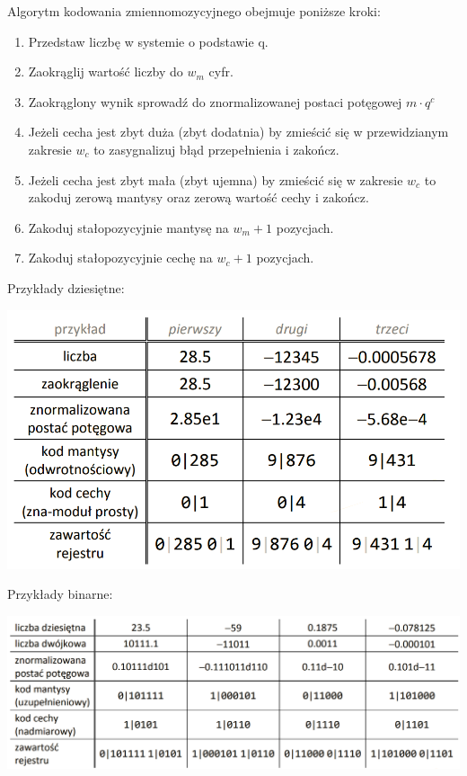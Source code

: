 \documentclass[12pt]{article}
\begin{document}
    Algorytm kodowania zmiennomozycyjnego obejmuje poniższe kroki:
    \begin{enumerate}
        \item Przedstaw liczbę w systemie o podstawie q.
        \item Zaokrąglij wartość liczby do $w_m$ cyfr.
        \item Zaokrąglony wynik sprowadź do znormalizowanej postaci
        potęgowej $m\cdot q^c$
        \item Jeżeli cecha jest zbyt duża (zbyt dodatnia) by zmieścić się
        w przewidzianym zakresie $w_c$ to zasygnalizuj błąd przepełnienia i zakończ.
        \item Jeżeli cecha jest zbyt mała (zbyt ujemna) by zmieścić się
        w zakresie $w_c$ to zakoduj zerową mantysy oraz zerową wartość cechy i zakończ.
        \item Zakoduj stałopozycyjnie mantysę na $w_m + 1$ pozycjach.
        \item Zakoduj stałopozycyjnie cechę na $w_c + 1$ pozycjach.
    \end{enumerate}
    
    Przykłady dziesiętne:
    
    \begin{center}
    \includegraphics[scale=0.4]{graphics/number-repr/fl-pt-encode-dec.png}
    \end{center}
    
    Przykłady binarne:
    
    \includegraphics[width=\linewidth]{graphics/number-repr/fl-pt-encode-bin.png}
    
\end{document}
